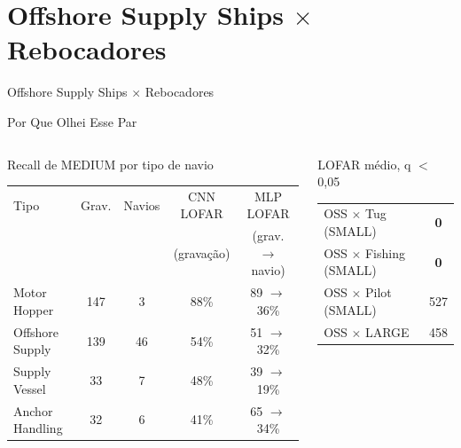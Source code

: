 \documentclass[aspectratio=169]{beamer}
\newcommand{\calo}[1]{\cellcolor{red!20}#1}
\begin{document}
\section{Offshore Supply Ships $\times$ Rebocadores}

\begin{frame}
    \centering
    \huge Offshore Supply Ships $\times$ Rebocadores
\end{frame}

\begin{frame}{Por Que Olhei Esse Par}
    \footnotesize
    \begin{columns}[t]
        \begin{block}{\small Recall de MEDIUM por tipo de navio}
            \scriptsize
            \centering
            \setlength{\tabcolsep}{2pt}
            \begin{tabular}{lcccc}
            \toprule
            Tipo & Grav. & Navios & CNN LOFAR & MLP LOFAR \\
             & & & (gravação) & (grav. $\to$ navio) \\
            \midrule
            Motor Hopper & 147 & 3 & 88\% & 89 $\to$ \calo{36\%} \\
            Offshore Supply & 139 & 46 & 54\% & 51 $\to$ \calo{32\%} \\
            Supply Vessel & 33 & 7 & 48\% & 39 $\to$ 19\% \\
            Anchor Handling & 32 & 6 & 41\% & 65 $\to$ 34\% \\
            \bottomrule
            \end{tabular}
        \end{block}
        \begin{block}{\small LOFAR médio, q $<$ 0,05}
            \scriptsize
            \centering
            \begin{tabular}{lc}
            \toprule
            OSS $\times$ Tug (SMALL) & \calo{\textbf{0}} \\
            OSS $\times$ Fishing (SMALL) & \calo{\textbf{0}} \\
            OSS $\times$ Pilot (SMALL) & 527 \\
            OSS $\times$ LARGE & 458 \\
            \bottomrule
            \end{tabular}


\end{block}
\end{columns}
\end{frame}
\end{document}
